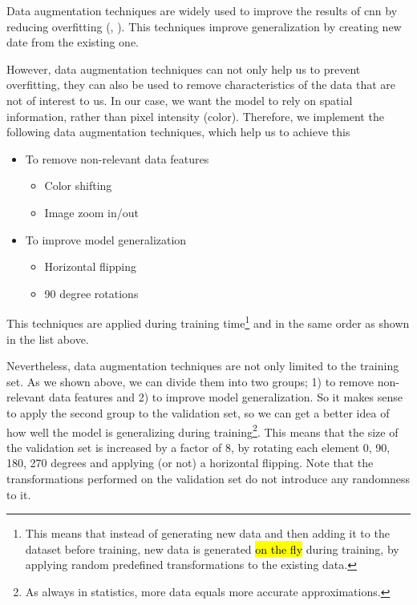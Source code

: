 
\glsresetall
\graphicspath{{./Sections/Dataset/Resources/}}

Data augmentation techniques are widely used to improve the results of \gls{cnn} by reducing overfitting (\cite{krizhevsky2017imagenet}, \cite{simard2003best}). This techniques improve generalization by creating new date from the existing one.

However, data augmentation techniques can not only help us to prevent overfitting, they can also be used to remove characteristics of the data that are not of interest to us. In our case, we want the model to rely on spatial information, rather than pixel intensity (color). Therefore, we implement the following data augmentation techniques, which help us to achieve this

\begin{itemize}
  \item To remove non-relevant data features
  \begin{itemize}
    \item Color shifting
    \item Image zoom in/out
  \end{itemize}
  \item To improve model generalization
  \begin{itemize}
    \item Horizontal flipping
    \item 90 degree rotations
  \end{itemize}
\end{itemize}

This techniques are applied during training time\footnote{This means that instead of generating new data and then adding it to the dataset before training, new data is generated \hl{on the fly} during training, by applying random predefined transformations to the existing data.} and in the same order as shown in the list above.

Nevertheless, data augmentation techniques are not only limited to the training set. As we shown above, we can divide them into two groups; 1) to remove non-relevant data features and 2) to improve model generalization. So it makes sense to apply the second group to the validation set, so we can get a better idea of how well the model is generalizing during training\footnote{As always in statistics, more data equals more accurate approximations.}. This means that the size of the validation set is increased by a factor of 8, by rotating each element 0, 90, 180, 270 degrees and applying (or not) a horizontal flipping. Note that the transformations performed on the validation set do not introduce any randomness to it.

